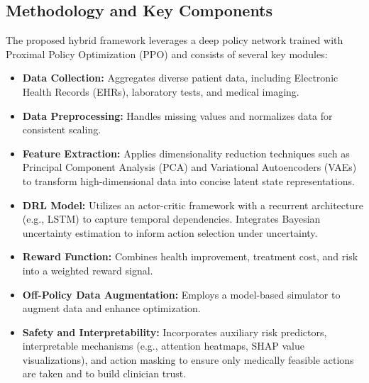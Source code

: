 \subsection*{Methodology and Key Components}
The proposed hybrid framework leverages a deep policy network trained with Proximal Policy Optimization (PPO) and consists of several key modules:
\begin{itemize}
    \item \textbf{Data Collection:} Aggregates diverse patient data, including Electronic Health Records (EHRs), laboratory tests, and medical imaging.
    \item \textbf{Data Preprocessing:} Handles missing values and normalizes data for consistent scaling.
    \item \textbf{Feature Extraction:} Applies dimensionality reduction techniques such as Principal Component Analysis (PCA) and Variational Autoencoders (VAEs) to transform high-dimensional data into concise latent state representations.
    \item \textbf{DRL Model:} Utilizes an actor-critic framework with a recurrent architecture (e.g., LSTM) to capture temporal dependencies. Integrates Bayesian uncertainty estimation to inform action selection under uncertainty.
    \item \textbf{Reward Function:} Combines health improvement, treatment cost, and risk into a weighted reward signal.
    \item \textbf{Off-Policy Data Augmentation:} Employs a model-based simulator to augment data and enhance optimization.
    \item \textbf{Safety and Interpretability:} Incorporates auxiliary risk predictors, interpretable mechanisms (e.g., attention heatmaps, SHAP value visualizations), and action masking to ensure only medically feasible actions are taken and to build clinician trust.
\end{itemize}

